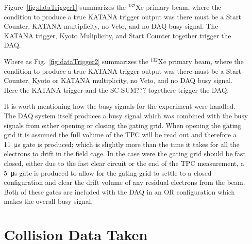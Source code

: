 Figure~\ref{fig:dataTrigger1} summarizes the ${}^{132}$Xe primary beam, where the condition to produce a true KATANA trigger output was there must be a Start Counter, KATANA multiplicity, no Veto, and no DAQ busy signal. The KATANA trigger, Kyoto Muliplicity, and Start Counter together trigger the DAQ. 

 Where as Fig.~\ref{fig:dataTrigger2} summarizes the ${}^{132}$Xe primary beam, where the condition to produce a true KATANA trigger output was there must be a Start Counter, Kyoto or KATANA multiplicity, no Veto, and no DAQ busy signal. Here the KATANA trigger and the SC SUM??? togethere trigger the DAQ. 
 
 It is worth mentioning how the busy signals for the experiment were handled. The DAQ system itself produces a busy signal which was combined with the busy signals from either opening or closing the gating grid. When opening the gating grid it is assumed the full volume of the TPC will be read out and therefore  a \SI{11}{\micro\second} gate is produced; which is slightly more than the time it takes for all the electrons to drift in the field cage. In the case were the gating grid should be fast closed, either due to the fast clear circuit or the end of the TPC measurement, a \SI{5}{\micro\second} gate is produced to allow for the gating grid to settle to a closed configuration and clear the drift volume of any residual electrons from the beam. Both of these gates are included with the DAQ in an OR configuration which makes the overall busy signal. 
 



\section{Collision Data Taken}


